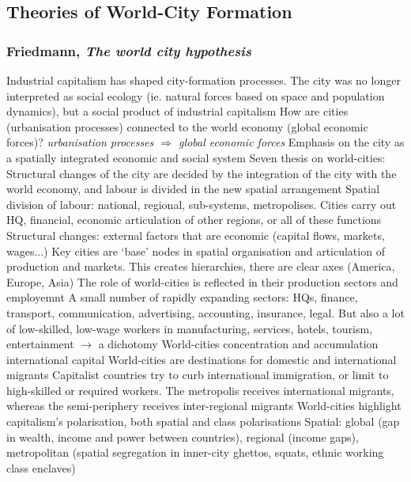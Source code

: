 \documentclass{article}
\begin{document}
\subsection{Theories of World-City Formation}

\subsubsection{Friedmann, \textit{The world city hypothesis}}

\begin{outline}
	\1 Industrial capitalism has shaped city-formation processes. The city was no longer interpreted as social ecology (ie. natural forces based on space and population dynamics), but a social product of industrial capitalism
	\1 How are cities (urbanisation processes) connected to the world economy (global economic forces)? \textit{urbanisation processes $\Rightarrow$ global economic forces}
	\1 Emphasis on the city as a spatially integrated economic and social system
	\1 Seven thesis on world-cities:
		\2 Structural changes of the city are decided by the integration of the city with the world economy, and labour is divided in the new spatial arrangement
			\3 Spatial division of labour: national, regional, sub-systems, metropolises. Cities carry out HQ, financial, economic articulation of other regions, or all of these functions
			\3 Structural changes: external factors that are economic (capital flows, markets, wages...)
		\2 Key cities are `base' nodes in spatial organisation and articulation of production and markets. This creates hierarchies, there are clear axes (America, Europe, Asia)
		\2 The role of world-cities is reflected in their production sectors and employemnt
			\3 A small number of rapidly expanding sectors: HQs, finance, transport, communication, advertising, accounting, insurance, legal. But also a lot of low-skilled, low-wage workers in manufacturing, services, hotels, tourism, entertainment $\rightarrow$ a dichotomy
		\2 World-cities concentration and accumulation international capital
		\2 World-cities are destinations for domestic and international migrants
			\3 Capitalist countries try to curb international immigration, or limit to high-skilled or required workers. The metropolis receives international migrants, whereas the semi-periphery receives inter-regional migrants
		\2 World-cities highlight capitalism's polarisation, both spatial and class polarisations
			\3 Spatial: global (gap in wealth, income and power between countries), regional (income gaps), metropolitan (spatial segregation in inner-city ghettos, squats, ethnic working class enclaves)

\end{outline}
\end{document}
